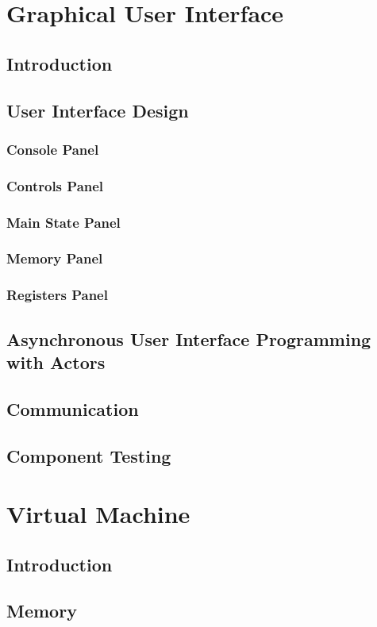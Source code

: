 \documentclass[a4paper,11pt]{report}
\begin{document}
\chapter{Graphical User Interface}
\section{Introduction}
\section{User Interface Design}
\subsection{Console Panel}
\subsection{Controls Panel}
\subsection{Main State Panel}
\subsection{Memory Panel}
\subsection{Registers Panel}
\section[Asynchronous UI Programming with Actors]{Asynchronous User Interface Programming with Actors}
\section{Communication}
\section{Component Testing}
\chapter{Virtual Machine}
\section{Introduction}
\section{Memory}
\end{document}
